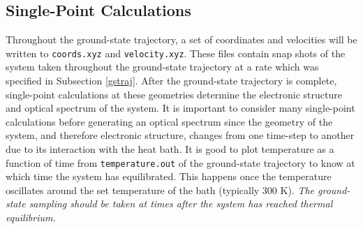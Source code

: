 \documentclass[letterpaper,12pt,titlepage]{article}
\begin{document}
\subsection{Single-Point Calculations}
\label{spcalc}
Throughout the ground-state trajectory, a set of coordinates and velocities will be written to \verb+coords.xyz+ and \verb+velocity.xyz+.  These files contain snap shots of the system taken throughout the ground-state trajectory at a rate which was specified in Subsection \ref{gstraj}.  After the ground-state trajectory is complete, single-point calculations at these geometries determine the electronic structure and optical spectrum of the system.  It is important to consider many single-point calculations before generating an optical spectrum since the geometry of the system, and therefore electronic structure, changes from one time-step to another due to its interaction with the heat bath.  It is good to plot temperature as a function of time from \verb+temperature.out+ of the ground-state trajectory to know at which time the system has equilibrated.  This happens once the temperature oscillates around the set temperature of the bath (typically 300 K).  {\it{The ground-state sampling should be taken at times after the system has reached thermal equilibrium.}}
\end{document}
